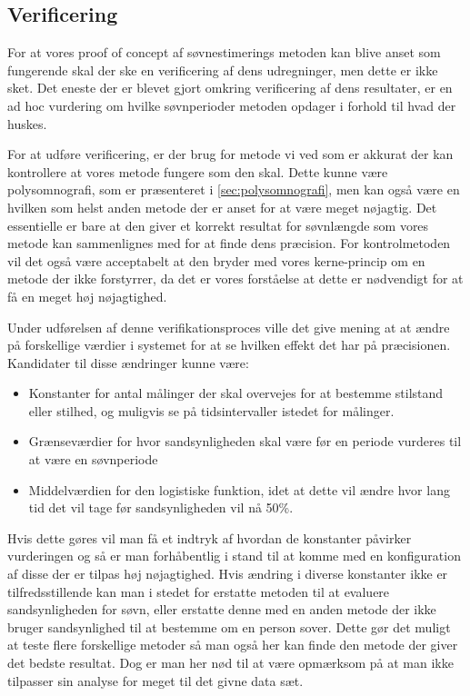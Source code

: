 \subsection{Verificering}
For at vores proof of concept af søvnestimerings metoden kan blive anset som fungerende skal der ske en verificering af dens udregninger, men dette er ikke sket.
Det eneste der er blevet gjort omkring verificering af dens resultater, er en ad hoc vurdering om hvilke søvnperioder metoden opdager i forhold til hvad der huskes.

For at udføre verificering, er der brug for metode vi ved som er akkurat der kan kontrollere at vores metode fungere som den skal.
Dette kunne være polysomnografi, som er præsenteret i \cref{sec:polysomnografi}, men kan også være en hvilken som helst anden metode der er anset for at være meget nøjagtig.
Det essentielle er bare at den giver et korrekt resultat for søvnlængde som vores metode kan sammenlignes med for at finde dens præcision.
For kontrolmetoden vil det også være acceptabelt at den bryder med vores kerne-princip om en metode der ikke forstyrrer, da det er vores forståelse at dette er nødvendigt for at få en meget høj nøjagtighed.

Under udførelsen af denne verifikationsproces ville det give mening at at ændre på forskellige værdier i systemet for at se hvilken effekt det har på præcisionen.
Kandidater til disse ændringer kunne være:
\begin{itemize}
	\item Konstanter for antal målinger der skal overvejes for at bestemme stilstand eller stilhed, og muligvis se på tidsintervaller istedet for målinger.
	\item Grænseværdier for hvor sandsynligheden skal være før en periode vurderes til at være en søvnperiode
	\item Middelværdien for den logistiske funktion, idet at dette vil ændre hvor lang tid det vil tage før sandsynligheden vil nå 50\%.
\end{itemize} 

Hvis dette gøres vil man få et indtryk af hvordan de konstanter påvirker vurderingen og så er man forhåbentlig i stand til at komme med en konfiguration af disse der er tilpas høj nøjagtighed.
Hvis ændring i diverse konstanter ikke er tilfredsstillende kan man i stedet for erstatte metoden til at evaluere sandsynligheden for søvn, eller erstatte denne med en anden metode der ikke bruger sandsynlighed til at bestemme om en person sover.
Dette gør det muligt at teste flere forskellige metoder så man også her kan finde den metode der giver det bedste resultat.
Dog er man her nød til at være opmærksom på at man ikke tilpasser sin analyse for meget til det givne data sæt.
